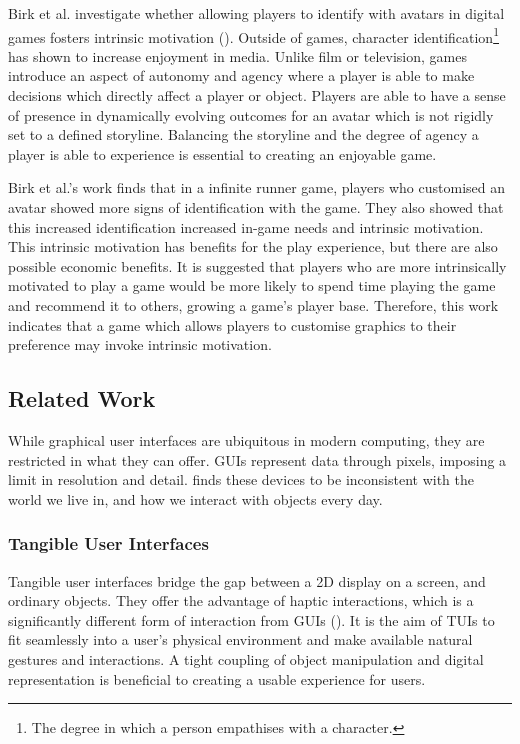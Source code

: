 \documentclass[12pt]{article}
\begin{document}
Birk et al. investigate whether allowing players to identify with avatars in digital games fosters intrinsic motivation (\cite{birk2016fostering}).
Outside of games, character identification\footnote{The degree in which a person empathises with a character.} has shown to increase enjoyment in media.
Unlike film or television, games introduce an aspect of autonomy and agency where a player is able to make decisions which directly affect a player or object. 
Players are able to have a sense of presence in dynamically evolving outcomes for an avatar which is not rigidly set to a defined storyline. 
Balancing the storyline and the degree of agency a player is able to experience is essential to creating an enjoyable game. 

Birk et al.'s work finds that in a infinite runner game, players who customised an avatar showed more signs of identification with the game. 
They also showed that this increased identification increased in-game needs and intrinsic motivation. 
This intrinsic motivation has benefits for the play experience, but there are also possible economic benefits. 
It is suggested that players who are more intrinsically motivated to play a game would be more likely to spend time playing the game and recommend it to others, growing a game's player base. 
Therefore, this work indicates that a game which allows players to customise graphics to their preference may invoke intrinsic motivation. 

\subsection{Related Work}
While graphical user interfaces are ubiquitous in modern computing, they are restricted in what they can offer. 
GUIs represent data through pixels, imposing a limit in resolution and detail.
\textcite{ishii2008tangible} finds these devices to be inconsistent with the world we live in, and how we interact with objects every day. 

\subsubsection{Tangible User Interfaces}
Tangible user interfaces bridge the gap between a 2D display on a screen, and ordinary objects. 
They offer the advantage of haptic interactions, which is a significantly different form of interaction from GUIs (\cite{ishii2008tangible}). 
It is the aim of TUIs to fit seamlessly into a user's physical environment and make available natural gestures and interactions. 
A tight coupling of object manipulation and digital representation is beneficial to creating a usable experience for users. 
\end{document}
